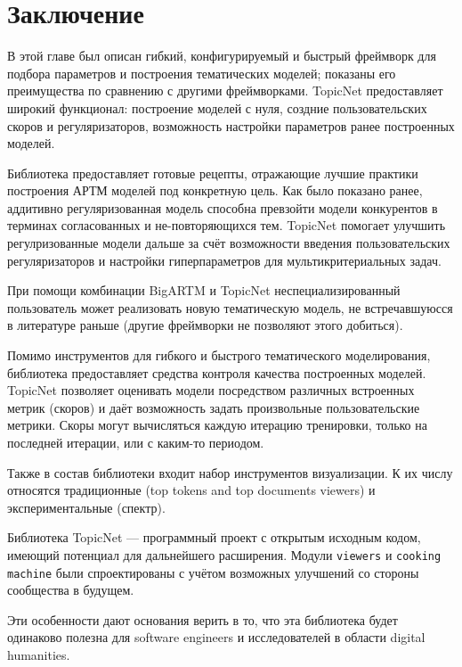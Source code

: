 \section{Заключение}
В этой главе был описан гибкий, конфигурируемый и быстрый фреймворк для подбора параметров и построения тематических моделей; показаны его преимущества по сравнению с другими фреймворками. TopicNet предоставляет широкий функционал: построение моделей с нуля, создние пользовательских скоров и регуляризаторов, возможность настройки параметров ранее построенных моделей.

Библиотека предоставляет готовые рецепты, отражающие лучшие практики построения АРТМ моделей под конкретную цель. Как было показано ранее, аддитивно регуляризованная модель способна превзойти модели конкурентов в терминах согласованных и не-повторяющихся тем. TopicNet помогает улучшить регулризованные модели дальше за счёт возможности введения пользовательских регуляризаторов и настройки гиперпараметров для мультикритериальных задач. 

При помощи комбинации BigARTM и TopicNet неспециализированный пользователь может реализовать новую тематическую модель, не встречавшуюсся в литературе раньше (другие фреймворки не позволяют этого добиться).


Помимо инструментов для гибкого и быстрого тематического моделирования, библиотека предоставляет средства контроля качества построенных моделей. TopicNet позволяет оценивать модели посредством различных встроенных метрик (скоров) и даёт возможность задать произвольные пользовательские метрики. Скоры могут вычисляться каждую итерацию тренировки, только на последней итерации, или с каким-то периодом. 

Также в состав библиотеки входит набор инструментов визуализации. К их числу относятся традиционные (top tokens and top documents viewers) и экспериментальные (спектр).

Библиотека TopicNet --- программный проект с открытым исходным кодом, имеющий потенциал для дальнейшего расширения. Модули \texttt{viewers} и \texttt{cooking machine} были спроектированы с учётом возможных улучшений со стороны сообщества в будущем.

Эти особенности дают основания верить в то, что эта библиотека будет одинаково полезна для software engineers и исследователей в области digital humanities.

